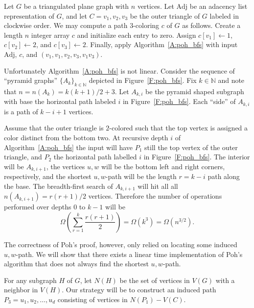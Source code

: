 \documentclass[12pt,letterpaper]{article}
\theoremstyle{plain}
\theoremstyle{definition}
\theoremstyle{break}
\begin{document}
Let $G$ be a triangulated plane graph with $n$ vertices. Let
$\text{Adj}$ be an adacency list representation of $G$, and
let $C=v_1,v_2,v_3$ be the outer triangle of $G$ labeled in clockwise order.
We may compute a path $3$-coloring $c$ of $G$ as follows.
Create a length $n$ integer array $c$ and initialize each entry to zero.
Assign $c[v_1]\leftarrow 1$,
$c[v_2]\leftarrow 2$, and $c[v_3]\leftarrow 2$. Finally, apply
Algorithm~\ref{A:poh_bfs}
with input $\text{Adj}$, $c$, and $(v_1, v_1, v_2, v_3, v_1v_3)$.

Unfortunately Algorithm~\ref{A:poh_bfs}
is not linear. Consider the sequence of ``pyramid graphs''
$\{A_k\}_{k\in\mathbb{N}}$ depicted in
Figure~\ref{F:poh_bfs}.
Fix $k\in\mathbb{N}$ and note that
$n=n(A_k)=k(k+1)/2+3$.
Let $A_{k,i}$ be the pyramid shaped subgraph with
base the horizontal path labeled $i$ in Figure~\ref{F:poh_bfs}.
Each ``side''
of $A_{k,i}$ is a path of $k-i+1$ vertices.

Assume that
the outer triangle is $2$-colored such that the top vertex is
assigned a color distinct from the bottom two. At recursive depth $i$ of
Algorithm~\ref{A:poh_bfs} the input will have $P_1$ still the top vertex of
the outer triangle, and $P_2$ the horizontal path labelled $i$
in Figure~\ref{F:poh_bfs}. The interior will be $A_{k, i+1}$,
the vertices $u,w$ will be the bottom left and right
corners, respectively, and the shortest $u,w$-path
will be the length $r=k-i$ path along the base.
The breadth-first search of $A_{k,i+1}$ will hit all
all $n(A_{k,i+1})=r(r+1)/2$ vertices.
Therefore the number of operations performed over depths $0$ to $k-1$
will be
\[
    \Omega\left( \sum_{r=1}^k\frac{r(r+1)}{2} \right)
    =\Omega(k^3)
    =\Omega(n^{3/2}).
\]

The correctness of Poh's proof, however, only relied on
locating some induced $u,w$-path.
We will show that there exists a linear time implementation of Poh's
algorithm that does not always find the shortest $u,w$-path.

For any subgraph $H$ of $G$, let $N(H)$ be the set of vertices in $V(G)$ with a
neighbor in $V(H)$. Our strategy will be to construct an induced
path $P_3=u_1,u_2,\ldots,u_d$ consisting of vertices in $N(P_1)-V(C)$.
\end{document}
